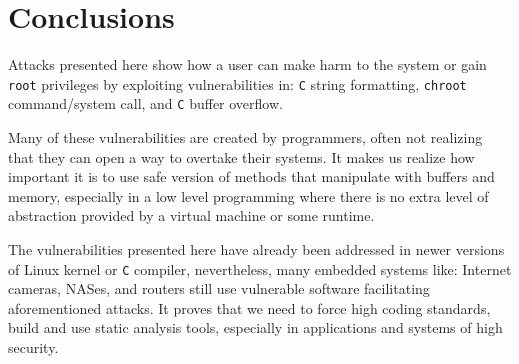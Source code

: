 \documentclass[12pt, a4paper, pdflatex]{article}
\begin{document}
\section{Conclusions}
Attacks presented here show how a user can make harm to the system or gain \texttt{root} privileges by exploiting vulnerabilities in: \texttt{C} string formatting, \texttt{chroot} command/system call, and \texttt{C} buffer overflow.

Many of these vulnerabilities are created by programmers, often not realizing that they can open a way to overtake their systems. It makes us realize how important it is to use safe version of methods that manipulate with buffers and memory, especially in a low level programming where there is no extra level of abstraction provided by a virtual machine or some runtime.

The vulnerabilities presented here have already been addressed in newer versions of Linux kernel or \texttt{C} compiler, nevertheless, many embedded systems like: Internet cameras, NASes, and routers still use vulnerable software facilitating aforementioned attacks. It proves that we need to force high coding standards, build and use static analysis tools, especially in applications and systems of high security.

\vfill


\end{document}
